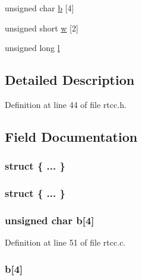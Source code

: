 \begin{DoxyCompactItemize}
\begin{tabbing}
\end{tabbing}\item 
unsigned char \hyperlink{unionrtcc_time_a61a5d0fa7c6684d64d4709fbec39695a}{b} \mbox{[}4\mbox{]}
\item 
unsigned short \hyperlink{unionrtcc_time_acd7a32916d80e0556e2e0348be16a805}{w} \mbox{[}2\mbox{]}
\item 
unsigned long \hyperlink{unionrtcc_time_a99612d7a42af4d8bc748c9de9089b41e}{l}
\end{DoxyCompactItemize}


\subsection{Detailed Description}


Definition at line 44 of file rtcc.\-h.



\subsection{Field Documentation}
\hypertarget{unionrtcc_time_a59017c70504dd8a4a87fd07e8edf6455}{\subsubsection[{"@1}]{\setlength{\rightskip}{0pt plus 5cm}struct \{ ... \} }}\label{unionrtcc_time_a59017c70504dd8a4a87fd07e8edf6455}
\hypertarget{unionrtcc_time_a2becc4040808d8d1b67a48cb9091b83d}{\subsubsection[{"@36}]{\setlength{\rightskip}{0pt plus 5cm}struct \{ ... \} }}\label{unionrtcc_time_a2becc4040808d8d1b67a48cb9091b83d}
\hypertarget{unionrtcc_time_a61a5d0fa7c6684d64d4709fbec39695a}{
\subsubsection[{b}]{\setlength{\rightskip}{0pt plus 5cm}unsigned char b\mbox{[}4\mbox{]}}}\label{unionrtcc_time_a61a5d0fa7c6684d64d4709fbec39695a}


Definition at line 51 of file rtcc.\-c.

\hypertarget{unionrtcc_time_a462b9a1d97366cdca568e1212ab06255}{
\subsubsection[{b}]{ b\mbox{[}4\mbox{]}}}\label{unionrtcc_time_a462b9a1d97366cdca568e1212ab06255}


